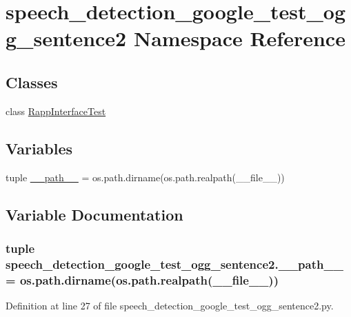 \hypertarget{namespacespeech__detection__google__test__ogg__sentence2}{\section{speech\-\_\-detection\-\_\-google\-\_\-test\-\_\-ogg\-\_\-sentence2 Namespace Reference}
\label{namespacespeech__detection__google__test__ogg__sentence2}
}
\subsection*{Classes}
\begin{DoxyCompactItemize}
\item 
class \hyperlink{classspeech__detection__google__test__ogg__sentence2_1_1RappInterfaceTest}{Rapp\-Interface\-Test}
\end{DoxyCompactItemize}
\subsection*{Variables}
\begin{DoxyCompactItemize}
\item 
tuple \hyperlink{namespacespeech__detection__google__test__ogg__sentence2_affb17d70175cf11c10fb02ce00a2b250}{\-\_\-\-\_\-path\-\_\-\-\_\-} = os.\-path.\-dirname(os.\-path.\-realpath(\-\_\-\-\_\-file\-\_\-\-\_\-))
\end{DoxyCompactItemize}


\subsection{Variable Documentation}
\hypertarget{namespacespeech__detection__google__test__ogg__sentence2_affb17d70175cf11c10fb02ce00a2b250}{
\subsubsection[{\-\_\-\-\_\-path\-\_\-\-\_\-}]{\setlength{\rightskip}{0pt plus 5cm}tuple speech\-\_\-detection\-\_\-google\-\_\-test\-\_\-ogg\-\_\-sentence2.\-\_\-\-\_\-path\-\_\-\-\_\- = os.\-path.\-dirname(os.\-path.\-realpath(\-\_\-\-\_\-file\-\_\-\-\_\-))}}\label{namespacespeech__detection__google__test__ogg__sentence2_affb17d70175cf11c10fb02ce00a2b250}


Definition at line 27 of file speech\-\_\-detection\-\_\-google\-\_\-test\-\_\-ogg\-\_\-sentence2.\-py.

